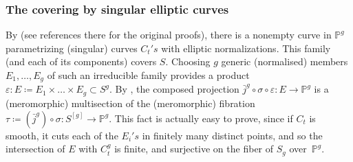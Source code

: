 \documentclass[JEP,XML,SOM,Unicode, NoEqCountersInSection,NoFloatCountersInSection,published]{cedram}
\theoremstyle{theorem}
\theoremstyle{definition}
\def\bP{{\mathbb P}}
\begin{document}
\subsubsection*{The covering by singular elliptic curves}
By \cite[VIII, Th.\,23.1]{BPV} (see references there for the original proofs), there is a nonempty curve in $\bP^g$ parametrizing (singular) curves $C_t's$ with elliptic normalizations. This family (and each of its components) covers $S$. Choosing $g$ generic (normalised) members $E_1,\dots,E_g$ of such an irreducible family provides a product $\varepsilon: E\coloneqq E_1\times \dots\times E_g\subset S^g$. By \cite[proof of Th.\,6.1]{HT}, the composed projection $\bar{j}^g\circ \sigma\circ \varepsilon:E\to \bP^g$ is a (meromorphic) multisection of the (meromorphic) fibration $\tau\coloneqq (\bar{j}^g)\circ \sigma: S^{[g]}\to \bP^g$. This fact is actually easy to prove, since if $C_t$ is smooth, it cuts each of the $E_i's$ in finitely many distinct points, and so the intersection of $E$ with $C_t^g$ is finite, and surjective on the fiber of $S_{g}$ over~$\bP^g$.
\end{document}
